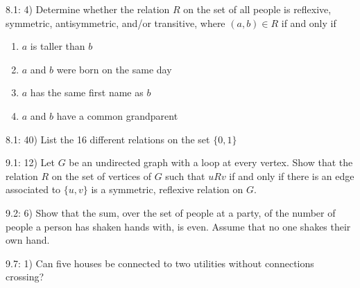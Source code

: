 \documentclass{article}
\begin{document}
8.1: 4) Determine whether the relation $R$ on the set of all people is reflexive, symmetric, antisymmetric, and/or transitive, where $(a,b) \in R$ if and only if

\begin{enumerate}[label=\alph{enumi})]
\item $a$ is taller than $b$
\item $a$ and $b$ were born on the same day
\item $a$ has the same first name as $b$
\item $a$ and $b$ have a common grandparent
\end{enumerate}

8.1: 40) List the 16 different relations on the set $\{0,1\}$

9.1: 12) Let $G$ be an undirected graph with a loop at every vertex.  Show that the relation $R$ on the set of vertices of $G$ such that $uRv$ if and only if there is an edge associated to $\{u,v\}$ is a symmetric, reflexive relation on $G$.

9.2: 6) Show that the sum, over the set of people at a party, of the number of people a person has shaken hands with, is even.  Assume that no one shakes their own hand.

9.7: 1) Can five houses be connected to two utilities without connections crossing?
\end{document}
